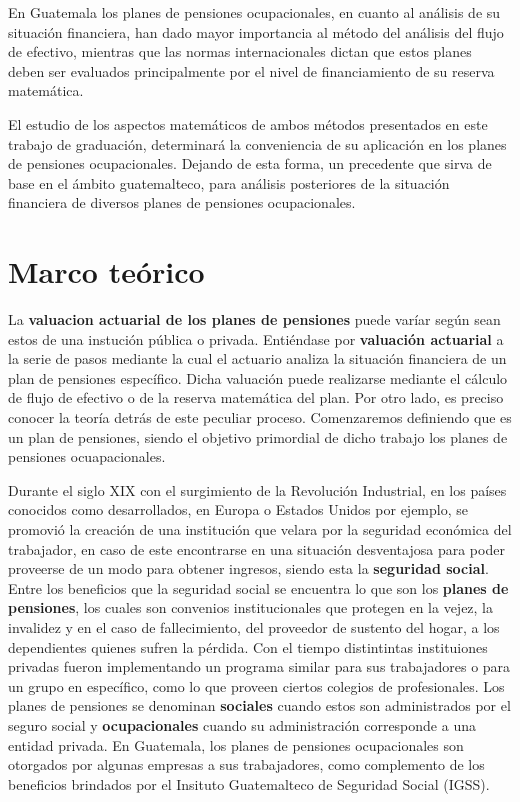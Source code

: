\documentclass[12pt,letterpaper,titlepage]{article}
\begin{document}
En Guatemala los planes de pensiones ocupacionales, en cuanto al análisis de su situación financiera, han dado mayor importancia al método del análisis del flujo de efectivo, mientras que las normas internacionales dictan que estos planes deben ser evaluados principalmente por el nivel de financiamiento de su reserva matemática.  \bigskip

El estudio de los aspectos matemáticos de ambos métodos presentados en este trabajo de graduación, determinará la conveniencia de su aplicación en los planes de pensiones ocupacionales. Dejando de esta forma, un precedente que sirva de base en el ámbito guatemalteco, para análisis posteriores de la situación financiera de diversos planes de pensiones ocupacionales.



\newpage

\section{Marco teórico}

La \textbf{valuacion actuarial de los planes de pensiones} puede varíar según sean estos de una instución pública o privada. Entiéndase por \textbf{valuación actuarial} a la serie de pasos mediante la cual el actuario analiza la situación financiera de un plan de pensiones específico. Dicha valuación puede realizarse mediante el cálculo de flujo de efectivo o de la reserva matemática del plan. Por otro lado, es preciso conocer la teoría detrás de este peculiar proceso. Comenzaremos definiendo que es un plan de pensiones, siendo el objetivo primordial de dicho trabajo los planes de pensiones ocuapacionales. 

Durante el siglo XIX con el surgimiento de la Revolución Industrial, en los países conocidos como desarrollados, en Europa o Estados Unidos por ejemplo,  se promovió la creación de una institución que velara por la seguridad económica del trabajador, en caso de este encontrarse en una situación desventajosa para poder proveerse de un modo para obtener ingresos, siendo esta la \textbf{seguridad social}. Entre los beneficios que la seguridad social se encuentra lo que son los \textbf{planes de pensiones}, los cuales son convenios institucionales que protegen en la vejez, la invalidez y en el caso de fallecimiento, del proveedor de sustento del hogar, a los dependientes quienes sufren la pérdida. Con el tiempo distintintas instituiones privadas fueron implementando un programa similar para sus trabajadores o para un grupo en específico, como lo que proveen ciertos colegios de profesionales. Los planes de pensiones se denominan \textbf{sociales} cuando estos son administrados por el seguro social y \textbf{ocupacionales} cuando su administración corresponde a una entidad privada.  En Guatemala, los planes de pensiones ocupacionales son otorgados por algunas empresas a sus trabajadores, como complemento de los beneficios brindados por el Insituto Guatemalteco de Seguridad Social (IGSS). 
\end{document}
